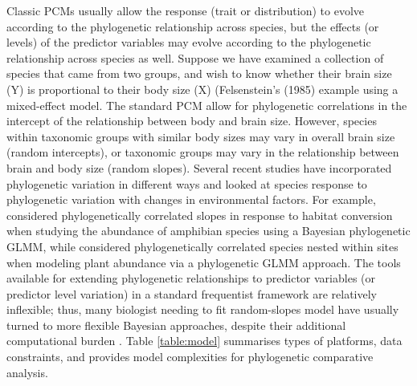 \documentclass[12pt]{article}
\begin{document}
% 

Classic PCMs usually allow the response (trait or distribution) to evolve according to the phylogenetic relationship across species, but the effects (or levels) of the predictor variables may evolve according to the phylogenetic relationship across species as well.
Suppose we have examined a collection of species that came from two groups, and wish to know whether their brain size (Y) is proportional to their body size (X) (Felsenstein's (1985) example using a mixed-effect model. 
The standard PCM allow for phylogenetic correlations in the intercept of the relationship between body and brain size. 
However, species within taxonomic groups with similar body sizes may vary in overall brain size (random intercepts), or taxonomic groups may vary in the relationship between brain and body size (random slopes). 
Several recent studies have incorporated phylogenetic variation in different ways and looked at species response to phylogenetic variation with changes in environmental factors.
For example, \cite{nowakowski2018phylogenetic} considered phylogenetically correlated slopes in response to habitat conversion when studying the abundance of amphibian species using a Bayesian phylogenetic GLMM, while \cite{li2017canfun} considered phylogenetically correlated species nested within sites when modeling plant abundance via a phylogenetic GLMM approach. 
The tools available for extending phylogenetic relationships to predictor variables (or predictor level variation) in a standard frequentist framework are relatively inflexible; thus, many biologist needing to fit random-slopes model have usually turned to more flexible Bayesian approaches, despite their additional computational burden \citep{hadfield2010mcmc, burkner2018brms}.
Table \ref{table:model} summarises types of platforms, data constraints, and provides model complexities for phylogenetic comparative analysis.
\end{document}
